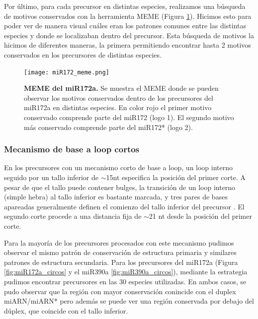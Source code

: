 Por último, para cada precursor en distintas especies, realizamos una búsqueda de motivos conservados con la herramienta MEME \citep{pmid22115189} (Figura \ref{fig:miR172_meme}).
Hicimos esto para poder ver de manera visual cuáles eran los patrones comunes entre las distintas especies y donde se localizaban dentro del precursor.
Esta búsqueda de motivos la hicimos de diferentes maneras, la primera permitiendo encontrar hasta 2 motivos conservados en los precursores de distintas especies.


\begin{landscape}
    \begin{figure}[htbp!] 
        \centering    
        \texttt{[image: miR172\_meme.png]}
        \caption[MEME del miR172a]{
			\textbf{MEME del miR172a.}
        Se muestra el MEME donde se pueden observar los motivos conservados dentro de los precursores del miR172a en distintas especies.
        En color rojo el primer motivo conservado comprende parte del miR172 (logo 1).
        El segundo motivo más conservado comprende parte del miR172* (logo 2).
        }
        \label{fig:miR172_meme}
    \end{figure}
\end{landscape}

\subsubsection{Mecanismo de base a loop cortos}

En los precursores con un mecanismo corto de base a loop, un loop interno seguido por un tallo inferior de $\sim$15nt especifica la posición del primer corte.
A pesar de que el tallo puede contener bulges, la transición de un loop interno (simple hebra) al tallo inferior es bastante marcada, y tres pares de bases apareadas generalmente definen el comienzo del tallo inferior del precursor \citep{Mateos2010,Bologna2013}.
El segundo corte procede a una distancia fija de $\sim$21 nt desde la posición del primer corte.

Para la mayoría de los precursores procesados con este mecanismo pudimos observar el mismo patrón de conservación de estructura primaria y similares patrones de estructura secundaria.
Para los precursores del miR172a (Figura \ref{fig:miR172a_circos} y el miR390a \ref{fig:miR390a_circos}), mediante la estrategia pudimos encontrar precursores en las 30 especies utilizadas.
En ambos casos, se pudo observar que la región con mayor conservación conincide con el duplex miARN/miARN* pero además se puede ver una región conservada por debajo del dúplex, que coincide con el tallo inferior.

